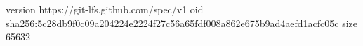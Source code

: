 version https://git-lfs.github.com/spec/v1
oid sha256:5c28db9f0c09a204224e2224f27c56a65fdf008a862e675b9ad4aefd1acfc05c
size 65632

